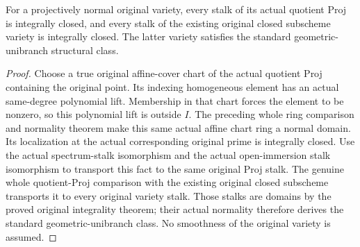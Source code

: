 \begin{theorem}
\label{thm:actual-original-projective-variety-normal-stalks}
\leanok
{}
For a projectively normal original variety, every stalk of its actual quotient
Proj is integrally closed, and every stalk of the existing original closed
subscheme variety is integrally closed. The latter variety satisfies the
standard geometric-unibranch structural class.
\end{theorem}
\begin{proof}
Choose a true original affine-cover chart of the actual quotient Proj containing
the original point. Its indexing homogeneous element has an actual same-degree
polynomial lift. Membership in that chart forces the element to be nonzero,
so this polynomial lift is outside $I$. The preceding whole ring comparison
and normality theorem make this same actual affine chart ring a normal domain.
Its localization at the actual corresponding original prime is integrally
closed. Use the actual spectrum-stalk isomorphism and the actual
open-immersion stalk isomorphism to transport this fact to the same original
Proj stalk. The genuine whole quotient-Proj comparison with the existing
original closed subscheme transports it to every original variety stalk.
Those stalks are domains by the proved original integrality theorem; their
actual normality therefore derives the standard geometric-unibranch class.
No smoothness of the original variety is assumed.
\end{proof}
